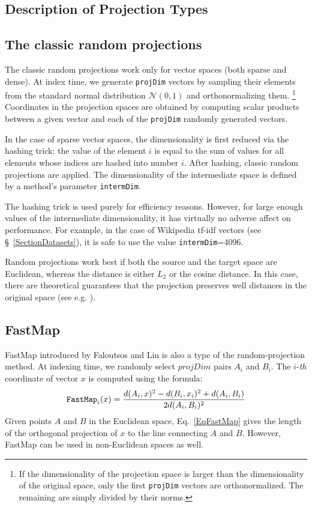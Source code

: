 \documentclass[runningheads,a4paper]{llncs}
\newcommand{\ttt}[1]{\texttt{#1}}
\begin{document}

%


\begin{appendix}
\section{Description of Projection Types}\label{SectionProjDetails}
\subsection{The classic random projections} 
The classic random projections work only for vector spaces (both sparse and dense).
At index time, we generate \ttt{projDim} vectors by sampling their elements from
the standard normal distribution $\mathcal{N}(0,1)$ and orthonormalizing them. \footnote{If 
the dimensionality of the projection space is larger than the dimensionality of the original
space, only the first \ttt{projDim} vectors are orthonormalized. The remaining are simply
divided by their norms.}
Coordinates in the projection spaces are obtained by computing scalar products
between a given vector and each of the \ttt{projDim} randomly generated vectors.

In the case of sparse vector spaces, the dimensionality is first reduced via the hashing trick:
the value of the element $i$ is equal to the sum of values for all elements whose indices are 
hashed into number $i$. 
After hashing, classic random projections are applied. 
The dimensionality of the intermediate space is defined by a method's parameter \ttt{intermDim}. 

The hashing trick is used purely for efficiency reasons. 
However, for large enough values of the intermediate
dimensionality, it has virtually no adverse affect on performance.
For example, in the case of Wikipedia tf-idf vectors (see \S~\ref{SectionDatasets}),
it is safe to use the value \ttt{intermDim}=4096.

Random projections work best if both the source and the target space are Euclidean,
whereas the distance is either $L_2$ or the cosine distance.
In this case, there are theoretical guarantees that the projection preserves
well distances in the original space (see e.g. \cite{bingham2001random}).

\subsection{FastMap} 
FastMap introduced by Faloutsos and Lin \cite{faloutsos1995fastmap}
is also a type of the random-projection method. 
At indexing time, we randomly select $projDim$ pairs $A_i$ and $B_i$.
The \mbox{$i$-\textit{th}} coordinate of vector $x$ is computed using the formula:
\begin{equation}\label{EqFastMap}
\mbox{\ttt{FastMap}}_{i}(x)  = \frac{d(A_i,x)^2 - d(B_i,x_i)^2 + d(A_i,B_i)}{2 d(A_i,B_i)^2}
\end{equation}
Given points $A$ and $B$ in the Euclidean space, Eq.~\ref{EqFastMap} gives the length of the
orthogonal projection of $x$ to the line connecting $A$ and $B$.
However, FastMap can be used in non-Euclidean spaces as well.


\end{appendix}
\end{document}
